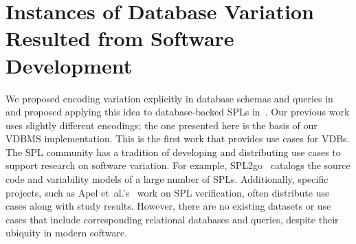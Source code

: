 \section{Instances of Database Variation Resulted from Software Development}
\label{sec:varsoft}

We proposed encoding variation explicitly in database schemas and queries
in~\cite{ATW17dbpl} and proposed applying this idea to database-backed SPLs
in~\cite{ATW18poly}. Our previous work uses slightly different encodings; the
one presented here is the basis of our VDBMS implementation.
This is the first work that provides use cases for VDBs.
%
The SPL community has a tradition of developing and distributing use cases
to support research on software variation. For example, SPL2go~\cite{SPL2go}
catalogs the source code and variability models of a large number of SPLs.
Additionally, specific projects, such as Apel
et~al.'s~\cite{apel2013strategies} work on SPL verification, often distribute
use cases along with study results.
%
However, there are no existing datasets or use cases that include
corresponding relational databases and queries, despite their ubiquity in
modern software.



